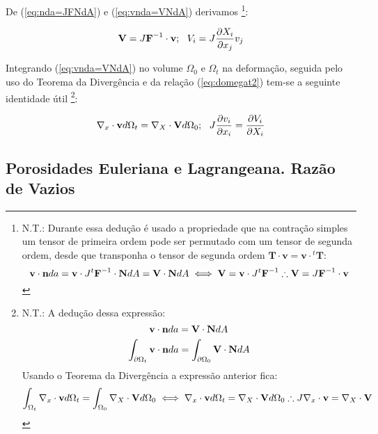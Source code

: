 \documentclass[
	11pt, %
	fleqn, %
	a4paper, %
]{LegrandOrangeBook}
\begin{document}
De (\ref{eq:nda=JFNdA}) e (\ref{eq:vnda=VNdA}) derivamos \footnote{N.T.: Durante essa dedução é usado a propriedade que na contração simples um tensor de primeira ordem pode ser permutado com um tensor de segunda ordem, desde que transponha o tensor de segunda ordem $\textbf{T} \cdot \textbf{v} = \textbf{v} \cdot {}^t\textbf{T}$:
	\begin{displaymath}	
	\textbf{v} \cdot \textbf{n} da = \textbf{v} \cdot J {}^t \textbf{F}^{-1} \cdot \textbf{N} dA = \textbf{V} \cdot \textbf{N} dA \iff \textbf{V} = \textbf{v} \cdot J {}^t \textbf{F}^{-1} \therefore  \textbf{V} = J \textbf{F}^{-1} \cdot \textbf{v}
	\end{displaymath}

}:

\begin{equation}
	\label{eq:V=JF-1}	
\textbf{V} = J \textbf{F}^{-1} \cdot \textbf{v}; ~~ V_i = J \dfrac{\partial X_i}{\partial x_j}v_j
\end{equation}

Integrando (\ref{eq:vnda=VNdA}) no volume $\Omega_0$ e $\Omega_t$ na deformação, seguida pelo uso do Teorema da Divergência e da relação (\ref{eq:domegat2}) tem-se a seguinte identidade útil \footnote{N.T.: A dedução dessa expressão:
	\begin{displaymath}	
		\textbf{v} \cdot \textbf{n} da = \textbf{V} \cdot \textbf{N} dA
	\end{displaymath}
	\begin{displaymath}	
	\int_{\partial \Omega_t}^{}\textbf{v} \cdot \textbf{n} da = \int_{\partial \Omega_0}^{}\textbf{V} \cdot \textbf{N} dA
	\end{displaymath}
	Usando o Teorema da Divergência a expressão anterior fica:
	\begin{displaymath}	
	\int_{\Omega_t}^{}\nabla_x \cdot \textbf{v} d\Omega_t = \int_{ \Omega_0}^{} \nabla_X \cdot \textbf{V} d\Omega_0 \iff \nabla_x \cdot \textbf{v} d\Omega_t = \nabla_X \cdot \textbf{V} d\Omega_0 \therefore J \nabla_x \cdot \textbf{v} = \nabla_X \cdot \textbf{V}
	\end{displaymath}

}:

\begin{equation}
	\label{eq:nablaxvdOmegat=nablaXVdOmega0}	
	\nabla_x \cdot \textbf{v} d\Omega_t = \nabla_X \cdot \textbf{V} d\Omega_0; ~~ J\dfrac{\partial v_i}{\partial x_i} = \dfrac{\partial V_i}{\partial X_i}
\end{equation}

\subsection{Porosidades Euleriana e Lagrangeana. Razão de Vazios}
\end{document}
